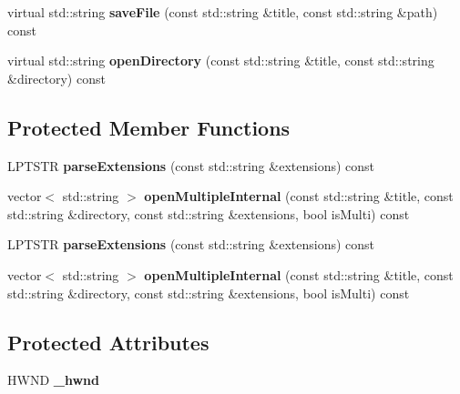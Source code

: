 \begin{DoxyCompactItemize}
\item 
\mbox{\label{classPlayerFileDialogServiceWin_a6c970480ffcf61a3e7075038e3b5aa6f}} 
virtual std\+::string {\bfseries save\+File} (const std\+::string \&title, const std\+::string \&path) const
\item 
\mbox{\label{classPlayerFileDialogServiceWin_af35ac4996a303ed14dab9c66d153dc40}} 
virtual std\+::string {\bfseries open\+Directory} (const std\+::string \&title, const std\+::string \&directory) const
\end{DoxyCompactItemize}
\subsection*{Protected Member Functions}
\begin{DoxyCompactItemize}
\item 
\mbox{\label{classPlayerFileDialogServiceWin_a8ea971e051178f982adf1e2b95b2aeac}} 
L\+P\+T\+S\+TR {\bfseries parse\+Extensions} (const std\+::string \&extensions) const
\item 
\mbox{\label{classPlayerFileDialogServiceWin_af75e6e33da275db250d93735570a3eed}} 
vector$<$ std\+::string $>$ {\bfseries open\+Multiple\+Internal} (const std\+::string \&title, const std\+::string \&directory, const std\+::string \&extensions, bool is\+Multi) const
\item 
\mbox{\label{classPlayerFileDialogServiceWin_a8ea971e051178f982adf1e2b95b2aeac}} 
L\+P\+T\+S\+TR {\bfseries parse\+Extensions} (const std\+::string \&extensions) const
\item 
\mbox{\label{classPlayerFileDialogServiceWin_a652d14f0108d6d993b27bcac06565dc2}} 
vector$<$ std\+::string $>$ {\bfseries open\+Multiple\+Internal} (const std\+::string \&title, const std\+::string \&directory, const std\+::string \&extensions, bool is\+Multi) const
\end{DoxyCompactItemize}
\subsection*{Protected Attributes}
\begin{DoxyCompactItemize}
\item 
\mbox{\label{classPlayerFileDialogServiceWin_a98ed55c479c4830b59b7ba23a0893447}} 
H\+W\+ND {\bfseries \+\_\+hwnd}
\end{DoxyCompactItemize}


